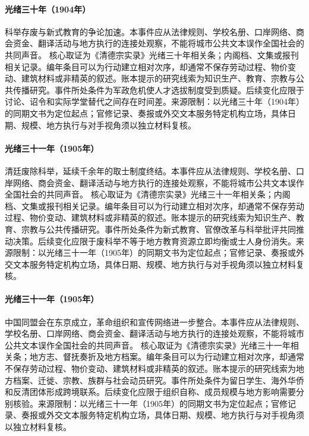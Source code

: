 \hypertarget{civic:EQ-1904-IMPERIAL-EXAMINATION-DEBATE}{}\paragraph{光绪三十年（1904年）}科举存废与新式教育的争论加速。本事件应从法律规则、学校名册、口岸网络、商会资金、翻译活动与地方执行的连接处观察，不能将城市公共文本误作全国社会的共同声音。 核心取证为《清德宗实录》光绪三十年相关条；内阁档、文集或报刊相关记录。编年条目可以为行动建立相对次序，却通常不保存劳动过程、物价变动、建筑材料或非精英的叙述。账本提示的研究线索为知识生产、教育、宗教与公共传播研究。事件所处条件为军政危机使人才选拔制度受到质疑。后续变化应限于讨论、诏令和实际学堂替代之间存在时间差。来源限制：以光绪三十年（1904年）的同期文书为定位起点；官修记录、奏报或外交文本服务特定机构立场，具体日期、规模、地方执行与对手视角须以独立材料复核。
\hypertarget{civic:EQ-1905-ABOLITION-OF-CIVIL-SERVICE-EXAM}{}\paragraph{光绪三十一年（1905年）}清廷废除科举，延续千余年的取士制度终结。本事件应从法律规则、学校名册、口岸网络、商会资金、翻译活动与地方执行的连接处观察，不能将城市公共文本误作全国社会的共同声音。 核心取证为《清德宗实录》光绪三十一年相关条；内阁档、文集或报刊相关记录。编年条目可以为行动建立相对次序，却通常不保存劳动过程、物价变动、建筑材料或非精英的叙述。账本提示的研究线索为知识生产、教育、宗教与公共传播研究。事件所处条件为新式教育、官僚改革与科举批评共同推动决策。后续变化应限于废科举不等于地方教育资源立即均衡或士人身份消失。来源限制：以光绪三十一年（1905年）的同期文书为定位起点；官修记录、奏报或外交文本服务特定机构立场，具体日期、规模、地方执行与对手视角须以独立材料复核。
\hypertarget{civic:EQ-1905-TONGMENGHUI}{}\paragraph{光绪三十一年（1905年）}中国同盟会在东京成立，革命组织和宣传网络进一步整合。本事件应从法律规则、学校名册、口岸网络、商会资金、翻译活动与地方执行的连接处观察，不能将城市公共文本误作全国社会的共同声音。 核心取证为《清德宗实录》光绪三十一年相关条；地方志、督抚奏折及地方档案。编年条目可以为行动建立相对次序，却通常不保存劳动过程、物价变动、建筑材料或非精英的叙述。账本提示的研究线索为地方档案、迁徙、宗教、族群与社会动员研究。事件所处条件为留日学生、海外华侨和反清团体形成跨境联系。后续变化应限于组织自称、成员规模与地方影响需要分别核验。来源限制：以光绪三十一年（1905年）的同期文书为定位起点；官修记录、奏报或外交文本服务特定机构立场，具体日期、规模、地方执行与对手视角须以独立材料复核。
